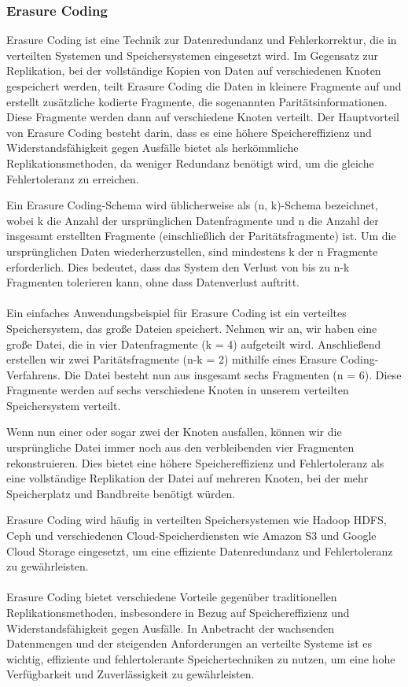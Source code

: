 \subsubsection{Erasure Coding}
Erasure Coding ist eine Technik zur Datenredundanz und Fehlerkorrektur, die in verteilten Systemen und Speichersystemen eingesetzt wird. Im Gegensatz zur Replikation, bei der vollständige Kopien von Daten auf verschiedenen Knoten gespeichert werden, teilt Erasure Coding die Daten in kleinere Fragmente auf und erstellt zusätzliche kodierte Fragmente, die sogenannten Paritätsinformationen. Diese Fragmente werden dann auf verschiedene Knoten verteilt. Der Hauptvorteil von Erasure Coding besteht darin, dass es eine höhere Speichereffizienz und Widerstandsfähigkeit gegen Ausfälle bietet als herkömmliche Replikationsmethoden, da weniger Redundanz benötigt wird, um die gleiche Fehlertoleranz zu erreichen.

Ein Erasure Coding-Schema wird üblicherweise als (n, k)-Schema bezeichnet, wobei k die Anzahl der ursprünglichen Datenfragmente und n die Anzahl der insgesamt erstellten Fragmente (einschließlich der Paritätsfragmente) ist. Um die ursprünglichen Daten wiederherzustellen, sind mindestens k der n Fragmente erforderlich. Dies bedeutet, dass das System den Verlust von bis zu n-k Fragmenten tolerieren kann, ohne dass Datenverlust auftritt.
\\\\
Ein einfaches Anwendungsbeispiel für Erasure Coding ist ein verteiltes Speichersystem, das große Dateien speichert. Nehmen wir an, wir haben eine große Datei, die in vier Datenfragmente (k = 4) aufgeteilt wird. Anschließend erstellen wir zwei Paritätsfragmente (n-k = 2) mithilfe eines Erasure Coding-Verfahrens. Die Datei besteht nun aus insgesamt sechs Fragmenten (n = 6). Diese Fragmente werden auf sechs verschiedene Knoten in unserem verteilten Speichersystem verteilt.

Wenn nun einer oder sogar zwei der Knoten ausfallen, können wir die ursprüngliche Datei immer noch aus den verbleibenden vier Fragmenten rekonstruieren. Dies bietet eine höhere Speichereffizienz und Fehlertoleranz als eine vollständige Replikation der Datei auf mehreren Knoten, bei der mehr Speicherplatz und Bandbreite benötigt würden.

Erasure Coding wird häufig in verteilten Speichersystemen wie Hadoop HDFS, Ceph und verschiedenen Cloud-Speicherdiensten wie Amazon S3 und Google Cloud Storage eingesetzt, um eine effiziente Datenredundanz und Fehlertoleranz zu gewährleisten.
\\\\
Erasure Coding bietet verschiedene Vorteile gegenüber traditionellen Replikationsmethoden, insbesondere in Bezug auf Speichereffizienz und Widerstandsfähigkeit gegen Ausfälle. In Anbetracht der wachsenden Datenmengen und der steigenden Anforderungen an verteilte Systeme ist es wichtig, effiziente und fehlertolerante Speichertechniken zu nutzen, um eine hohe Verfügbarkeit und Zuverlässigkeit zu gewährleisten.

